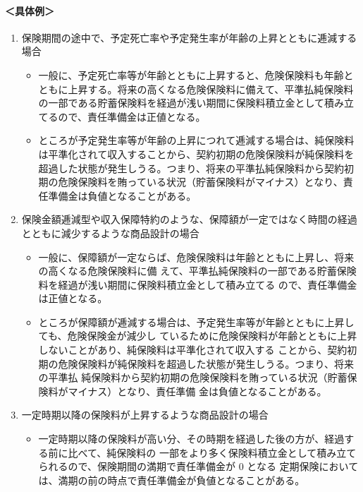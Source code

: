 \documentclass[report,gutter=10mm,fore-edge=10mm,uplatex,dvipdfmx]{jlreq}
\begin{document}
\paragraph{＜具体例＞} 
\begin{enumerate} [◯]
 
\item 保険期間の途中で、予定死亡率や予定発生率が年齢の上昇とともに逓減する場合

 \begin{itemize}
 \item 一般に、予定死亡率等が年齢とともに上昇すると、危険保険料も年齢とともに上昇する。将来の高くなる危険保険料に備えて、平準払純保険料の一部である貯蓄保険料を経過が浅い期間に保険料積立金として積み立てるので、責任準備金は正値となる。
 \item ところが予定発生率等が年齢の上昇につれて逓減する場合は、純保険料は平準化されて収入することから、契約初期の危険保険料が純保険料を超過した状態が発生しうる。つまり、将来の平準払純保険料から契約初期の危険保険料を賄っている状況（貯蓄保険料がマイナス）となり、責任準備金は負値となることがある。
 \end{itemize}

\item 保険金額逓減型や収入保障特約のような、保障額が一定ではなく時間の経過とともに減少するような商品設計の場合

 \begin{itemize}
 \item 一般に、保障額が一定ならば、危険保険料は年齢とともに上昇し、将来の高くなる危険保険料に備
 えて、平準払純保険料の一部である貯蓄保険料を経過が浅い期間に保険料積立金として積み立てる ので、責任準備金は正値となる。
 \item ところが保障額が逓減する場合は、予定発生率等が年齢とともに上昇しても、危険保険金が減少し
 ているために危険保険料が年齢とともに上昇しないことがあり、純保険料は平準化されて収入する ことから、契約初期の危険保険料が純保険料を超過した状態が発生しうる。つまり、将来の平準払
 純保険料から契約初期の危険保険料を賄っている状況（貯蓄保険料がマイナス）となり、責任準備 金は負値となることがある。
 \end{itemize}

 \item 一定時期以降の保険料が上昇するような商品設計の場合

 \begin{itemize}
 \item 一定時期以降の保険料が高い分、その時期を経過した後の方が、経過する前に比べて、純保険料の
 一部をより多く保険料積立金として積み立てられるので、保険期間の満期で責任準備金が 0 となる
 定期保険においては、満期の前の時点で責任準備金が負値となることがある。
 \end{itemize}
\end{enumerate}
\end{document}
